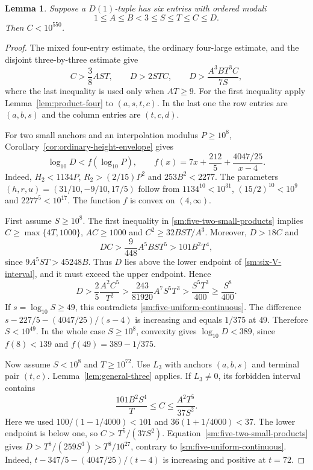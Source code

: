 \documentclass[12pt]{article}
\newtheorem{lemma}[theorem]{Lemma}
\numberwithin{equation}{section}
\begin{document}
\begin{lemma}\label{sm:bs7-cutoff}
Suppose a $D(1)$-tuple has six entries with ordered moduli
\[
 1\le A\le B<3\le S\le T\le C\le D.
\]
Then $C<10^{550}$.
\end{lemma}
\begin{proof}
The mixed four-entry estimate, the ordinary four-large estimate, and
 the disjoint three-by-three estimate give
\begin{equation}\label{sm:five-two-small-products}
 C>\frac38AST,\qquad D>2STC,\qquad
 D>\frac{A^3BT^3C}{7S},
\end{equation}
where the last inequality is used only when $AT\ge9$.
For the first inequality apply Lemma~\ref{lem:product-four} to
$(a,s,t,c)$. In the last one the row entries are $(a,b,s)$ and the
column entries are $(t,c,d)$.

For two small anchors and an interpolation modulus $P\ge10^8$,
Corollary~\ref{cor:ordinary-height-envelope} gives
\begin{equation}\label{sm:five-uniform-continuous}
 \log_{10}D<f(\log_{10}P),\qquad
 f(x)=7x+\frac{212}{5}+\frac{4047/25}{x-4}.
\end{equation}
Indeed, $H_2<1134P$, $R_2>(2/15)P^2$ and $253B^2<2277$.
The parameters $(h,r,u)=(31/10,-9/10,17/5)$ follow from
$1134^{10}<10^{31}$, $(15/2)^{10}<10^9$ and $2277^5<10^{17}$.
The function $f$ is convex on $(4,\infty)$.

First assume $S\ge10^8$. The first inequality in
\eqref{sm:five-two-small-products} implies
$C\ge\max\{4T,1000\}$, $AC\ge1000$ and $C^2\ge32BST/A^3$.
Moreover, $D>18C$ and
\[
 DC>\frac9{448}A^5BST^5>101B^2T^4,
\]
since $9A^5ST>45248B$. Thus $D$ lies above the lower endpoint of
\eqref{sm:six-V-interval}, and it must exceed the upper endpoint. Hence
\begin{equation}\label{sm:five-two-small-lower}
 D>\frac25\frac{A^2C^5}{T^2}
  >\frac{243}{81920}A^7S^5T^3
  >\frac{S^5T^3}{400}\ge\frac{S^8}{400}.
\end{equation}
If $s=\log_{10}S\ge49$, this contradicts
\eqref{sm:five-uniform-continuous}. The difference
$s-227/5-(4047/25)/(s-4)$ is increasing and equals $1/375$ at $49$.
Therefore $S<10^{49}$. In the whole case $S\ge10^8$, convexity gives
$\log_{10}D<389$, since $f(8)<139$ and $f(49)=389-1/375$.

Now assume $S<10^8$ and $T\ge10^{72}$. Use $L_3$ with anchors
$(a,b,s)$ and terminal pair $(t,c)$. Lemma~\ref{lem:general-three}
applies. If $L_3\ne0$, its forbidden interval contains
\[
 \frac{101B^2S^4}{T}\le C\le\frac{A^2T^5}{37S^2}.
\]
Here we used $100/(1-1/4000)<101$ and
$36(1+1/4000)<37$. The lower endpoint is below one, so
$C>T^5/(37S^2)$. Equation~\eqref{sm:five-two-small-products} gives
$D>T^8/(259S^3)>T^8/10^{27}$, contrary to
\eqref{sm:five-uniform-continuous}. Indeed,
$t-347/5-(4047/25)/(t-4)$ is increasing and positive at $t=72$.


\end{proof}
\end{document}
